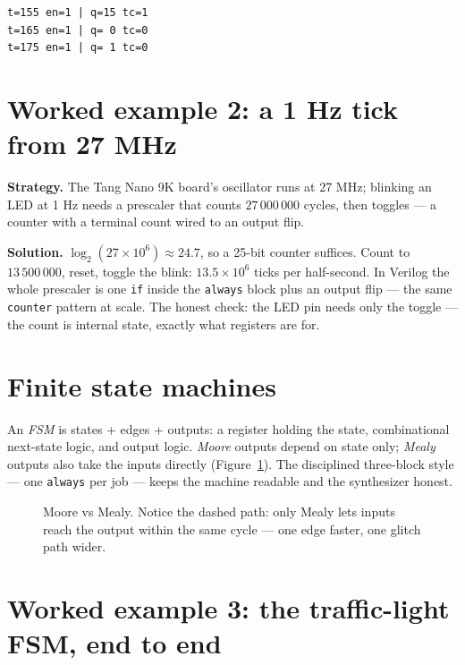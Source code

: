 \begin{lstlisting}[caption={Real run tail --- rollover at 15 with
\texttt{tc} asserted, counting resumes from 0.},abovecaptionskip=0pt]
t=155 en=1 | q=15 tc=1
t=165 en=1 | q= 0 tc=0
t=175 en=1 | q= 1 tc=0
\end{lstlisting}

\section{Worked example 2: a 1 Hz tick from 27 MHz}
\label{sec:we-tick}

\textbf{Strategy.} The Tang Nano 9K board's oscillator runs at 27 MHz;
blinking an LED at 1 Hz needs a prescaler that counts
$27\,000\,000$ cycles, then toggles — a counter with a terminal count
wired to an output flip.

\textbf{Solution.} $\log_2(27{\times}10^6)\approx 24.7$, so a 25-bit
counter suffices. Count to $13\,500\,000$, reset, toggle the blink:
$13.5{\times}10^6$ ticks per half-second. In Verilog the whole prescaler
is one \texttt{if} inside the \texttt{always} block plus an output flip —
the same \texttt{counter} pattern at scale. The honest check: the LED
pin needs only the toggle — the count is internal state, exactly what
registers are for.

\section{Finite state machines}
\label{sec:fsm}

An \emph{FSM} is states + edges + outputs:
a register holding the state, combinational next-state logic, and
output logic. \emph{Moore} outputs depend on state
only; \emph{Mealy} outputs also take the inputs
directly (Figure~\ref{fig:mealy_moore}). The disciplined three-block
style — one \texttt{always} per job — keeps the machine readable and
the synthesizer honest.

\begin{figure}[htbp]
\centering

\caption{Moore vs Mealy. Notice the dashed path: only Mealy lets inputs
reach the output within the same cycle — one edge faster, one glitch
path wider.}
\label{fig:mealy_moore}
\end{figure}

\section{Worked example 3: the traffic-light FSM, end to end}
\label{sec:we-traffic}

